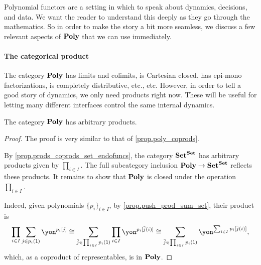 \documentclass[Book-Poly]{subfiles}
\begin{document}
Polynomial functors are a setting in which to speak about dynamics, decisions, and data. We want the reader to understand this deeply as they go through the mathematics. So in order to make the story a bit more seamless, we discuss a few relevant aspects of $\mathbf{Poly}$ that we can use immediately.


\paragraph{The categorical product}
The category $\mathbf{Poly}$ has limits and colimits, is Cartesian closed, has epi-mono factorizations, is completely distributive, etc., etc. However, in order to tell a good story of dynamics, we only need products right now. These will be useful for letting many different interfaces control the same internal dynamics.

\begin{proposition}\label{prop.poly_times}
The category $\mathbf{Poly}$ has arbitrary products. 
\end{proposition}
\begin{proof}
The proof is very similar to that of \cref{prop.poly_coprods}.

By \cref{prop.prods_coprods_set_endofuncs}, the category $\mathbf{Set}^{\mathbf{Set}}$ has arbitrary products given by $\prod_{i \in I}$.
The full subcategory inclusion $\mathbf{Poly} \to \mathbf{Set}^{\mathbf{Set}}$ reflects these products.
It remains to show that $\mathbf{Poly}$ is closed under the operation $\prod_{i \in I}$.

Indeed, given polynomials $\{p_i\}_{i \in I}$, by \cref{prop.push_prod_sum_set}, their product is
\begin{equation} \label{eqn.poly_prod}
    \prod_{i \in I} \sum_{j \in p_i(\1)} \yon^{p_i[j]} \iso \sum_{\bar{j} \in \prod_{i \in I} p_i(\1)} \prod_{i \in I} \yon^{p_i[\bar{j}(i)]} \iso \sum_{\bar{j} \in \prod_{i \in I} p_i(\1)} \yon^{\sum_{i \in I} p_i[\bar{j}(i)]},
\end{equation}
which, as a coproduct of representables, is in $\mathbf{Poly}$.
\end{proof}
\end{document}
